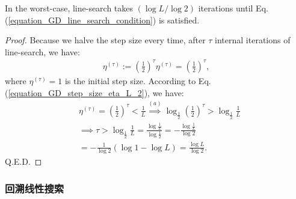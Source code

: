 \documentclass[lang=cn,10pt]{gorgeousnbook}
\numberwithin{equation}{section}%
\numberwithin{figure}{section}%
\begin{document}
\begin{lemma}\label{lemma_time_complexity_line_search}
In the worst-case, line-search takes $(\log L / \log 2)$ iterations until Eq. (\ref{equation_GD_line_search_condition}) is satisfied. 
\end{lemma}
\begin{proof}
Because we halve the step size every time, after $\tau$ internal iterations of line-search, we have:
\begin{align*}
\eta^{(\tau)} := (\frac{1}{2})^\tau \eta^{(\tau)} = (\frac{1}{2})^\tau,
\end{align*}
where $\eta^{(\tau)} = 1$ is the initial step size. 
According to Eq. (\ref{equation_GD_step_size_eta_L_2}), we have:
\begin{align*}
&\eta^{(\tau)} = (\frac{1}{2})^\tau < \frac{1}{L} \overset{(a)}{\implies} \log_{\frac{1}{2}} (\frac{1}{2})^\tau > \log_{\frac{1}{2}} \frac{1}{L} \\
&\implies \tau > \log_{\frac{1}{2}} \frac{1}{L} = \frac{\log \frac{1}{L}}{\log \frac{1}{2}} = -\frac{\log \frac{1}{L}}{\log 2} \\
&= -\frac{1}{\log 2} (\log 1 - \log L) = \frac{\log L}{\log 2}.
\end{align*}
Q.E.D.
\end{proof}

\subsubsection{回溯线性搜索}\label{section_GD_Armijo_line_search}

\end{document}
